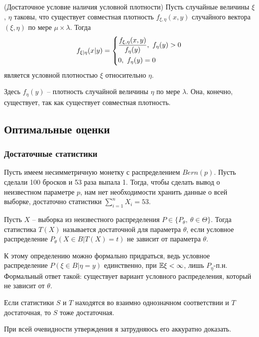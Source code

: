 \begin{theorem} (Достаточное условие наличия условной плотности)
    Пусть случайные величины $\xi$, $\eta$ таковы, что существует совместная плотность $f_{\xi, \eta}(x, y)$ случайного вектора $(\xi, \eta)$ по мере $\mu \times \lambda$. Тогда
    \[
        f_{\xi | \eta}(x | y) = \left\{\begin{aligned}
            & \frac{f_{\xi, \eta}(x, y)}{f_\eta(y)},\ f_\eta(y) > 0
            \\
            & 0,\ f_\eta(y) = 0
        \end{aligned}\right.
    \]
    является условной плотностью $\xi$ относительно $\eta$.

    Здесь $f_\eta(y)$ -- плотность случайной величины $\eta$ по мере $\lambda$. Она, конечно, существует, так как существует совместная плотность.
\end{theorem}

\subsection{Оптимальные оценки}

\subsubsection{Достаточные статистики}

\begin{note}
    Пусть имеем несимметричную монетку с распределением $Bern(p)$. Пусть сделали 100 бросков и 53 раза выпала 1. Тогда, чтобы сделать вывод о неизвестном параметре $p$, нам нет необходимости хранить данные о всей выборке, достаточно статистики $\sum_{i=1}^n X_i = 53$.
\end{note}

\begin{definition}
    Пусть $X$ -- выборка из неизвестного распределения $P \in \{P_\theta,\ \theta \in \Theta\}$. Тогда статистика $T(X)$ называется достаточной для параметра $\theta$, если условное распределение $P_\theta(X \in B | T(X) = t)$ не зависит от параметра $\theta$.

    К этому определению можно формально придраться, ведь условное распределение $P(\xi \in B | \eta = y)$ единственно, при $\mathbb{E}\xi < \infty$, лишь $P_\eta$-п.н. Формальный ответ такой: существует вариант условного распределения, который не зависит от $\theta$.
\end{definition}

\begin{note}
    Если статистики $S$ и $T$ находятся во взаимно однозначном соответствии и $T$ достаточная, то $S$ тоже достаточная.

    При всей очевидности утверждения я затрудняюсь его аккуратно доказать.
\end{note}

